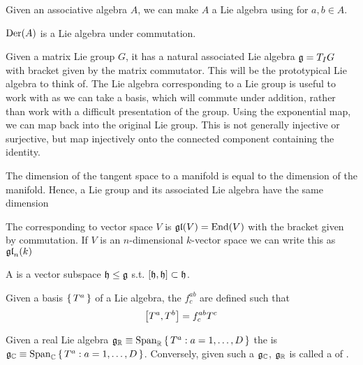 \documentclass{article}
\begin{document}
\begin{example}
	Given an associative algebra $A$, we can make $A$ a Lie algebra using 
	for $a,b \in A$. 
\end{example}

\begin{example}
	$\Der(A)$ is a Lie algebra under commutation. 
\end{example}

\begin{idea}
	Given a matrix Lie group $G$, it has a natural associated Lie algebra $\mf{g}=T_{I}G$ with bracket given by the matrix commutator. This will be the prototypical Lie algebra to think of. The Lie algebra corresponding to a Lie group is useful to work with as we can take a basis, which will commute under addition, rather than work with a difficult presentation of the group.
	Using the exponential map, we can map back into the original Lie group. This is not generally injective or surjective, but map injectively onto the connected component containing the identity. 
\end{idea}

\begin{fact}
	The dimension of the tangent space to a manifold is equal to the dimension of the manifold. Hence, a Lie group and its associated Lie algebra have the same dimension
\end{fact}

\begin{definition}
	The  corresponding to vector space $V$ is $\mf{gl}(V) = \End(V)$ with the bracket given by commutation. If $V$ is an $n$-dimensional $k$-vector space we can write this as $\mf{gl}_n(k)$
\end{definition}

\begin{definition}
	A  is a vector subspace $\mf{h} \leq \mf{g}$ s.t. $\comm[\mf{h}]{\mf{h}} \subset \mf{h}$. 
\end{definition}

\begin{definition}
	Given a basis $\set{T^a}$ of a Lie algebra, the  $f^{ab}_c$ are defined such that 
	\[
	\comm[T^a]{T^b}=f^{ab}_c T^c
	\]
\end{definition}

\begin{definition}
	Given a  real Lie algebra $\mf{g}_\mathbb{R}\equiv\spn_{\mathbb{R}}\set{ T^a : a=1, \dots, D }$ the 
	is $\mf{g}_\mathbb{C}\equiv\spn_{\mathbb{C}}\set{ T^a : a=1, \dots, D }$. Conversely, given such a $\mf{g}_\mathbb{C}$, $\mf{g}_\mathbb{R}$ is called a  of .  
\end{definition}
\end{document}

